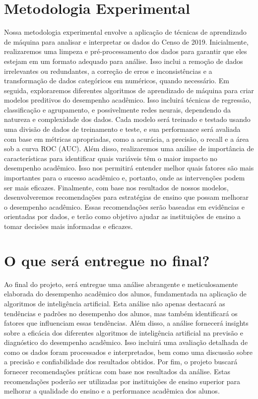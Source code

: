 \documentclass[conference]{IEEEtran}
\begin{document}
\section{Metodologia Experimental}
Nossa metodologia experimental envolve a aplicação de técnicas de aprendizado de máquina para analisar e interpretar os dados do Censo de 2019. Inicialmente, realizaremos uma limpeza e pré-processamento dos dados para garantir que eles estejam em um formato adequado para análise. Isso inclui a remoção de dados irrelevantes ou redundantes, a correção de erros e inconsistências e a transformação de dados categóricos em numéricos, quando necessário.
Em seguida, exploraremos diferentes algoritmos de aprendizado de máquina para criar modelos preditivos do desempenho acadêmico. Isso incluirá técnicas de regressão, classificação e agrupamento, e possivelmente redes neurais, dependendo da natureza e complexidade dos dados. Cada modelo será treinado e testado usando uma divisão de dados de treinamento e teste, e sua performance será avaliada com base em métricas apropriadas, como a acurácia, a precisão, o recall e a área sob a curva ROC (AUC).
Além disso, realizaremos uma análise de importância de características para identificar quais variáveis têm o maior impacto no desempenho acadêmico. Isso nos permitirá entender melhor quais fatores são mais importantes para o sucesso acadêmico e, portanto, onde as intervenções podem ser mais eficazes.
Finalmente, com base nos resultados de nossos modelos, desenvolveremos recomendações para estratégias de ensino que possam melhorar o desempenho acadêmico. Essas recomendações serão baseadas em evidências e orientadas por dados, e terão como objetivo ajudar as instituições de ensino a tomar decisões mais informadas e eficazes.

\section{O que será entregue no final?}
Ao final do projeto, será entregue uma análise abrangente e meticulosamente elaborada do desempenho acadêmico dos alunos, fundamentada na aplicação de algoritmos de inteligência artificial. Esta análise não apenas destacará as tendências e padrões no desempenho dos alunos, mas também identificará os fatores que influenciam essas tendências.
Além disso, a análise fornecerá insights sobre a eficácia dos diferentes algoritmos de inteligência artificial na previsão e diagnóstico do desempenho acadêmico. Isso incluirá uma avaliação detalhada de como os dados foram processados e interpretados, bem como uma discussão sobre a precisão e confiabilidade dos resultados obtidos.
Por fim, o projeto buscará fornecer recomendações práticas com base nos resultados da análise. Estas recomendações poderão ser utilizadas por instituições de ensino superior para melhorar a qualidade do ensino e a performance acadêmica dos alunos.
\end{document}

